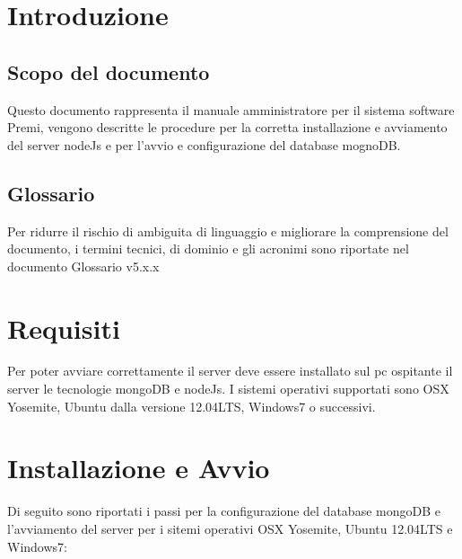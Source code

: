 \documentclass[a4paper,12pt]{article}
\title{\titoloDoc}
\newcommand{\parti}{./parti/}
\newcommand{\temp}{../../Template/}
\begin{document}
	\newpage
	\newpage
	\newpage
	\tableofcontents %
	\newpage
	\listoffigures
	\listoftables
	\newpage
	
\section{Introduzione}
\subsection{Scopo del documento}
Questo documento rappresenta il manuale amministratore per il sistema software Premi, vengono descritte le procedure per la corretta installazione e avviamento del server nodeJs  e per l'avvio e configurazione del database mognoDB.

\subsection{Glossario}
Per ridurre il rischio di ambiguita di linguaggio e migliorare la comprensione del documento, i termini tecnici, di dominio e gli acronimi sono riportate nel documento Glossario v5.x.x

\section{Requisiti}
Per poter avviare correttamente il server deve essere installato sul pc ospitante il server le tecnologie mongoDB e nodeJs. I sistemi operativi supportati sono OSX Yosemite, Ubuntu dalla versione 12.04LTS, Windows7 o successivi.

\section{Installazione e Avvio}

Di seguito sono riportati i passi per la configurazione del database mongoDB e l'avviamento del server per i sitemi operativi OSX Yosemite, Ubuntu  12.04LTS e Windows7:
\end{document}
